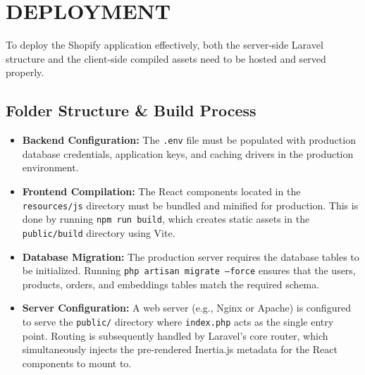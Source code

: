 \chapter{DEPLOYMENT}

To deploy the Shopify application effectively, both the server-side Laravel structure and the client-side compiled assets need to be hosted and served properly.

\section{Folder Structure \& Build Process}
\begin{itemize}
    \item \textbf{Backend Configuration:} The \texttt{.env} file must be populated with production database credentials, application keys, and caching drivers in the production environment.
    \item \textbf{Frontend Compilation:} The React components located in the \texttt{resources/js} directory must be bundled and minified for production. This is done by running \texttt{npm run build}, which creates static assets in the \texttt{public/build} directory using Vite.
    \item \textbf{Database Migration:} The production server requires the database tables to be initialized. Running \texttt{php artisan migrate --force} ensures that the users, products, orders, and embeddings tables match the required schema.
    \item \textbf{Server Configuration:} A web server (e.g., Nginx or Apache) is configured to serve the \texttt{public/} directory where \texttt{index.php} acts as the single entry point. Routing is subsequently handled by Laravel's core router, which simultaneously injects the pre-rendered Inertia.js metadata for the React components to mount to.
\end{itemize}


